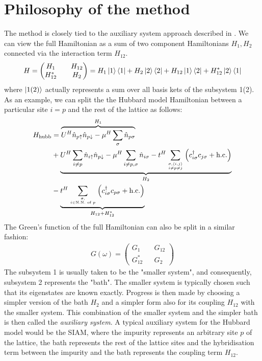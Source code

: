 \documentclass{article}
\numberwithin{equation}{section}
\begin{document}
\section{Philosophy of the method}
The method is closely tied to the auxiliary system approach described in \cite{martin_2016}. We can view the full Hamiltonian as a sum of two component Hamiltonians \(H_1, H_2\) connected via the interaction term \(H_{12}\).
\begin{equation}\begin{aligned}
	H = \begin{pmatrix} H_1 && H_{12} \\ H_{12}^* && H_2 \end{pmatrix} = H_1 \ket{1}\bra{1} + H_2\ket{2}\bra{2} + H_{12}\ket{1}\bra{2} + H_{12}^*\ket{2}\bra{1}
\end{aligned}\end{equation}
where \(\ket{1(2)}\) actually represents a sum over all basis kets of the subsystem 1(2). As an example, we can split the the Hubbard model Hamiltonian between a particular site \(i = p\) and the rest of the lattice as follows:
\begin{equation}\begin{aligned}
	H_\text{hubb} &= \overbrace{U^H\hat n_{p \uparrow} \hat n_{p \downarrow} - \mu^H \sum_\sigma \hat n_{p \sigma}}^{H_1} \\
		      &+ \underbrace{U^H\sum_{i \neq p}\hat n_{i \uparrow} \hat n_{p \downarrow} - \mu^H \sum_{i \neq p, \sigma} \hat n_{i \sigma} -t^H\sum_{\sigma,\left<i,j \right>\atop{i \neq p \neq j}}\left(c^\dagger_{i\sigma} c_{j\sigma} + \text{h.c.}\right)}_{H_2}\\
		      & -\underbrace{t^H\sum_{\sigma,\atop{i \in \text{N.N. of }p}}\left(c^\dagger_{i\sigma} c_{p\sigma} + \text{h.c.}\right)}_{H_{12} + H_{12}^*}\\
\end{aligned}\end{equation}
The Green's function of the full Hamiltonian can also be split in a similar fashion:
\begin{equation}\begin{aligned}
	G(\omega) = \begin{pmatrix} G_1 && G_{12} \\ G_{12}^* && G_2 \end{pmatrix} 
\end{aligned}\end{equation}
The subsystem 1 is usually taken to be the "smaller system", and consequently, subsystem 2 represents the "bath". The smaller system is typically chosen such that its eigenstates are known exactly. Progress is then made by choosing a simpler version of the bath \(H_2\) and a simpler form also for its coupling \(H_{12}\) with the smaller system. This combination of the smaller system and the simpler bath is then called the \textit{auxiliary system}. A typical auxiliary system for the Hubbard model would be the SIAM, where the impurity represents an arbitrary site \(p\) of the lattice, the bath represents the rest of the lattice sites and the hybridisation term between the impurity and the bath represents the coupling term \(H_{12}\).
\end{document}
